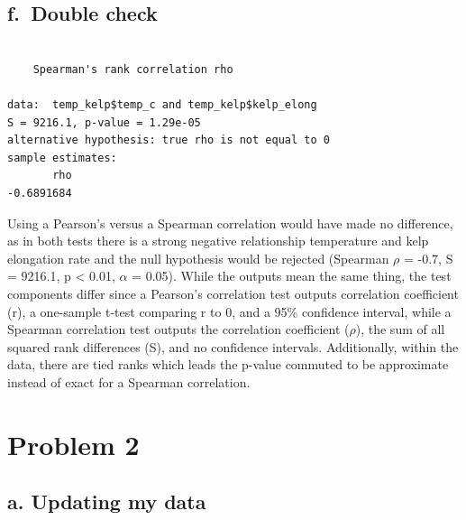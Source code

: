 \documentclass[
  letterpaper,
  DIV=11,
  numbers=noendperiod]{scrartcl}
\newenvironment{Shaded}{\begin{snugshade}}{\end{snugshade}}
\newcommand{\AttributeTok}[1]{\textcolor[rgb]{0.40,0.45,0.13}{#1}}
\newcommand{\CommentTok}[1]{\textcolor[rgb]{0.37,0.37,0.37}{#1}}
\newcommand{\FunctionTok}[1]{\textcolor[rgb]{0.28,0.35,0.67}{#1}}
\newcommand{\NormalTok}[1]{\textcolor[rgb]{0.00,0.23,0.31}{#1}}
\newcommand{\SpecialCharTok}[1]{\textcolor[rgb]{0.37,0.37,0.37}{#1}}
\newcommand{\StringTok}[1]{\textcolor[rgb]{0.13,0.47,0.30}{#1}}
\begin{document}
\subsection{f.~Double check}\label{f.-double-check}

\begin{Shaded}
\end{Shaded}

\begin{verbatim}

    Spearman's rank correlation rho

data:  temp_kelp$temp_c and temp_kelp$kelp_elong
S = 9216.1, p-value = 1.29e-05
alternative hypothesis: true rho is not equal to 0
sample estimates:
       rho 
-0.6891684 
\end{verbatim}

Using a Pearson's versus a Spearman correlation would have made no
difference, as in both tests there is a strong negative relationship
temperature and kelp elongation rate and the null hypothesis would be
rejected (Spearman \(\rho\) = -0.7, S = 9216.1, p \textless{} 0.01,
\(\alpha\) = 0.05). While the outputs mean the same thing, the test
components differ since a Pearson's correlation test outputs correlation
coefficient (r), a one-sample t-test comparing r to 0, and a 95\%
confidence interval, while a Spearman correlation test outputs the
correlation coefficient (\(\rho\)), the sum of all squared rank
differences (S), and no confidence intervals. Additionally, within the
data, there are tied ranks which leads the p-value commuted to be
approximate instead of exact for a Spearman correlation.

\section{Problem 2}\label{problem-2}

\subsection{a. Updating my data}\label{a.-updating-my-data}
\end{document}

